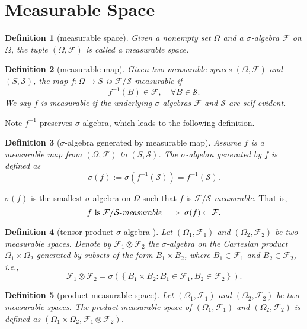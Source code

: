 \documentclass{report}
\newtheorem{definition}{Definition}[section]
\theoremstyle{nonumberplain}
\begin{document}
\section{Measurable Space}
\begin{definition}[measurable space]
	Given a nonempty set $\Omega$ and a $\sigma$-algebra $\mathcal{F}$ on  $\Omega$, the tuple $(\Omega,\mathcal{F})$ is called a \emph{measurable space}.
\end{definition}

\begin{definition}[measurable map]
	Given two measurable spaces $(\Omega,\mathcal{F})$ and $(S,\mathcal{S})$, the map $f:\Omega\to S$ is $\mathcal{F}/\mathcal{S}$-\emph{measurable} if
	\[
	f^{-1}(B)\in\mathcal{F},\quad\forall B\in\mathcal{S} .
	\]
	We say $f$ is measurable if the underlying $\sigma$-algebras $\mathcal{F}$ and $\mathcal{S}$ are self-evident. 
\end{definition}
Note $f^{-1}$ preserves $\sigma$-algebra, which leads to the following definition.

\begin{definition}[$\sigma$-algebra generated by measurable map]
	Assume $f$ is a measurable map from $(\Omega,\mathcal{F})$ to $(S,\mathcal{S})$. The $\sigma$-algebra generated by $f$ is defined as
	\[
	\sigma(f):=\sigma\left(f^{-1}(\mathcal{S})\right)=f^{-1}(\mathcal{S}).
	\]
\end{definition}
$\sigma(f)$ is the smallest $\sigma$-algebra on $\Omega$ such that $f$ is $\mathcal{F}/\mathcal{S}$-\emph{measurable}. That is,  
\[
	\text{$f$ is $\mathcal{F}/\mathcal{S}$-\emph{measurable}}\implies \sigma(f)\subset\mathcal{F}.
\] 

\begin{definition}[tensor product $\sigma$-algebra ]
	Let $(\Omega_1,\mathcal{F}_1)$ and $(\Omega_2,\mathcal{F}_2)$ be two measurable spaces. Denote by $\mathcal{F}_1\otimes\mathcal{F}_2$ the $\sigma$-algebra on the Cartesian product $\Omega_1\times\Omega_2$ generated by subsets of the form $B_1\times B_2$, where $B_{1}\in\mathcal{F}_1$ and $B_{2}\in\mathcal{F}_2$, i.e., 
	\[
	\mathcal{F}_{1} \otimes \mathcal{F}_{2} = \sigma\left(\left\{B_{1} \times B_{2}: B_{1} \in \mathcal{F}_{1}, B_{2} \in \mathcal{F}_{2}\right\}\right).
	\]
\end{definition}

\begin{definition}[product measurable space]
	Let $(\Omega_1,\mathcal{F}_1)$ and $(\Omega_2,\mathcal{F}_2)$ be two measurable spaces. The \emph{product measurable space} of $(\Omega_1,\mathcal{F}_1)$ and $(\Omega_2,\mathcal{F}_2)$ is defined as $(\Omega_1\times\Omega_2,\mathcal{F}_1\otimes\mathcal{F}_2)$. 
\end{definition}
\end{document}
